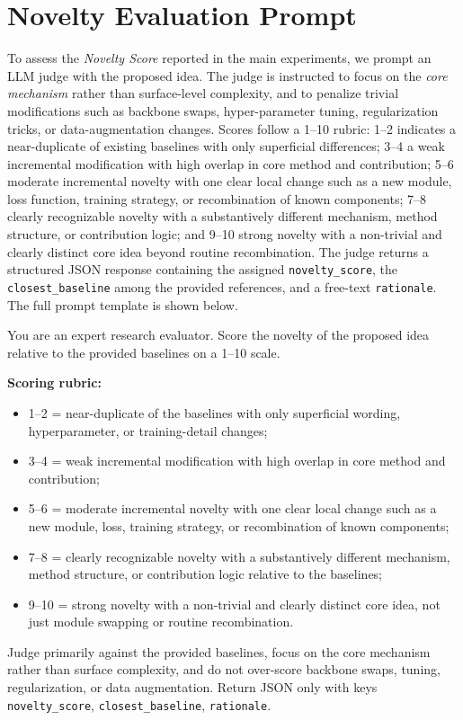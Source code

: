 \documentclass{opendatalab}
\begin{document}
\section{Novelty Evaluation Prompt}
\label{app:novelty_prompt}

To assess the \textit{Novelty Score} reported in the main experiments, we prompt an LLM judge with the proposed idea. The judge is instructed to focus on the \emph{core mechanism} rather than surface-level complexity, and to penalize trivial modifications such as backbone swaps, hyper-parameter tuning, regularization tricks, or data-augmentation changes. Scores follow a 1--10 rubric: 1--2 indicates a near-duplicate of existing baselines with only superficial differences; 3--4 a weak incremental modification with high overlap in core method and contribution; 5--6 moderate incremental novelty with one clear local change such as a new module, loss function, training strategy, or recombination of known components; 7--8 clearly recognizable novelty with a substantively different mechanism, method structure, or contribution logic; and 9--10 strong novelty with a non-trivial and clearly distinct core idea beyond routine recombination. The judge returns a structured JSON response containing the assigned \texttt{novelty\_score}, the \texttt{closest\_baseline} among the provided references, and a free-text \texttt{rationale}. The full prompt template is shown below.

\begin{tcolorbox}[
  breakable,
  colback=gray!5,
  colframe=black!60,
  boxrule=0.5pt,
  arc=2pt,
  left=6pt, right=6pt, top=6pt, bottom=6pt,
  title=\textbf{Prompt: Novelty Judge},
  fonttitle=\small\bfseries
]
\small
You are an expert research evaluator. Score the novelty of the proposed idea relative to the provided baselines on a 1--10 scale.

\medskip
\textbf{Scoring rubric:}
\begin{itemize}\setlength\itemsep{1pt}
  \item 1--2 = near-duplicate of the baselines with only superficial wording, hyperparameter, or training-detail changes;
  \item 3--4 = weak incremental modification with high overlap in core method and contribution;
  \item 5--6 = moderate incremental novelty with one clear local change such as a new module, loss, training strategy, or recombination of known components;
  \item 7--8 = clearly recognizable novelty with a substantively different mechanism, method structure, or contribution logic relative to the baselines;
  \item 9--10 = strong novelty with a non-trivial and clearly distinct core idea, not just module swapping or routine recombination.
\end{itemize}

\medskip
Judge primarily against the provided baselines, focus on the core mechanism rather than surface complexity, and do not over-score backbone swaps, tuning, regularization, or data augmentation. Return JSON only with keys \texttt{novelty\_score}, \texttt{closest\_baseline}, \texttt{rationale}.
\end{tcolorbox}
\end{document}
